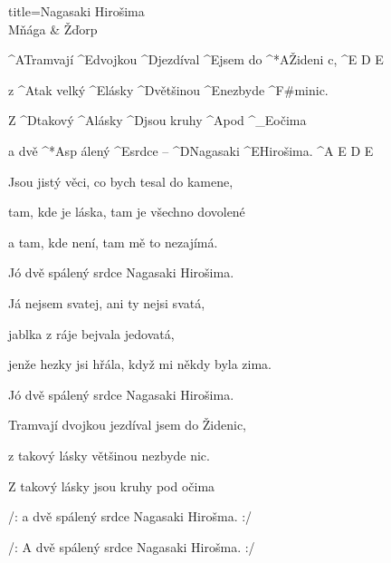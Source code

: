 \begin{song}{title=\predtitle\centering Nagasaki Hirošima \\\large Mňága \&  Žďorp  \vspace*{-0.3cm}}  %
\begin{centerjustified}
\nejnejvetsi

\sloka
	^{A\z }Tramvají ^{E\z }dvojkou ^{D\z }jezdíval ^{E}jsem do ^*{\z A}Žideni c, ^{E\,\,D\,\,E}

	z ^{A}tak velký ^{E\z }lásky ^{D\z}většinou ^{E\z }nezbyde ^{F#mi\z }nic.~~~

	Z ^{D\z }takový ^{A\z}lásky ^{D\z}jsou kruhy ^{A\z}pod ^{{\color{white}\_}E}očima

	a dvě ^*{A}sp álený ^{E\z }srdce -- ^{D\z }Nagasaki ^{E\z}Hirošima. ^{A\,\,E\,\,D\,\,E}

\sloka
	Jsou jistý věci, co bych tesal do kamene,
	
	tam, kde je láska, tam je všechno dovolené
	
	a tam, kde není, tam mě to nezajímá.
	
	Jó dvě spálený srdce Nagasaki Hirošima.

\sloka
	Já nejsem svatej, ani ty nejsi svatá,
	
	jablka z ráje bejvala jedovatá,
	
	jenže hezky jsi hřála, když mi někdy byla zima.
	
	Jó dvě spálený srdce Nagasaki Hirošima.

\sloka
	Tramvají dvojkou jezdíval jsem do Židenic,
	
	z takový lásky většinou nezbyde nic.
	
	Z takový lásky jsou kruhy pod očima

	/: a dvě spálený srdce Nagasaki Hirošma. :/
	
	/: A dvě spálený srdce Nagasaki Hirošma. :/

\end{centerjustified}
\setcounter{Slokočet}{0}
\end{song}


